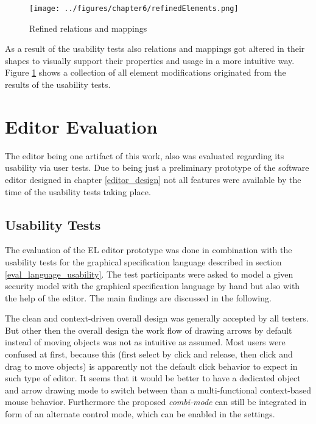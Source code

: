 \documentclass[twoside, openright, 12pt]{book}
\begin{document}
\begin{figure}[htb]
	\centering
	\texttt{[image: ../figures/chapter6/refinedElements.png]}
	\caption{Refined relations and mappings}
	\label{fig:refinedElements}
\end{figure}

As a result of the usability tests also relations and mappings got altered in their shapes to visually support their properties and usage in a more intuitive way.
Figure \ref{fig:refinedElements} shows a collection of all element modifications originated from the results of the usability tests.



\section{Editor Evaluation}
\label{eval_editor}
The editor being one artifact of this work, also was evaluated regarding its usability via user tests.
Due to being just a preliminary prototype of the software editor designed in chapter \ref{editor_design} not all features were available by the time of the usability tests taking place.



\subsection{Usability Tests}
\label{eval_editor_usability}
The evaluation of the EL editor prototype was done in combination with the usability tests for the graphical specification language described in section \ref{eval_language_usability}.
The test participants were asked to model a given security model with the graphical specification language by hand but also with the help of the editor.
The main findings are discussed in the following.

The clean and context-driven overall design was generally accepted by all testers. 
But other then the overall design the work flow of drawing arrows by default instead of moving objects was not as intuitive as assumed.
Most users were confused at first, because this (first select by click and release, then click and drag to move objects) is apparently not the default click behavior to expect in such type of editor.
It seems that it would be better to have a dedicated object and arrow drawing mode to switch between than a multi-functional context-based mouse behavior.
Furthermore the proposed \textit{combi-mode} can still be integrated in form of an alternate control mode, which can be enabled in the settings.
\end{document}
